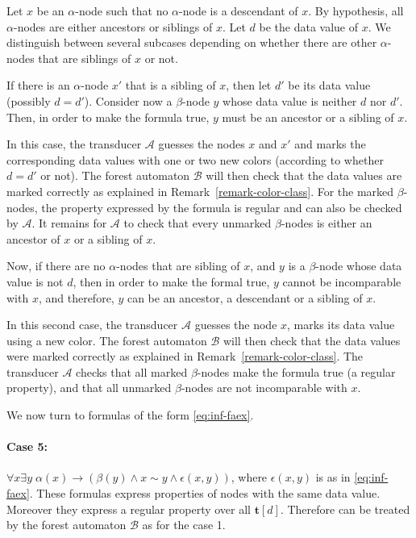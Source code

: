 \documentclass{CSML}
\newcommand\dataeq{\ensuremath{\sim}}
\newcommand\Aa{\mathcal{A}}
\newcommand\Ba{\mathcal{B}}
\newcommand\tree{\boldsymbol{t}}
\begin{document}
Let $x$ be an $\alpha$-node such that no $\alpha$-node is a descendant of $x$. 
By hypothesis, all $\alpha$-nodes are either ancestors or siblings of $x$. 
Let $d$ be the data value of $x$.
We distinguish between several subcases depending on whether 
there are other $\alpha$-nodes that are siblings of $x$ or not.

If there is an $\alpha$-node $x'$ that is a sibling of $x$, then let $d'$
be its data value (possibly $d=d'$).  Consider
now a $\beta$-node $y$ whose data value is neither $d$ nor $d'$.  
Then, in order to make the formula true, $y$ must be an ancestor or a sibling of $x$.

In this case, the transducer $\Aa$ guesses the nodes $x$ and $x'$ and marks the
corresponding data values with one or two new colors (according to whether $d = d'$
or not).  The forest automaton $\Ba$ will then check that the data values are marked
correctly as explained in Remark~\ref{remark-color-class}.
For the marked $\beta$-nodes, the property expressed by the formula
is regular and can also be checked by $\Aa$.
It remains for $\Aa$ to check that every unmarked $\beta$-nodes is 
either an ancestor of $x$ or a sibling of $x$.

Now, if there are no $\alpha$-nodes that are sibling of $x$,
and $y$ is a $\beta$-node whose data value is not $d$, 
then in order to make the formal true, $y$ cannot be incomparable with $x$, 
and therefore, $y$ can be an ancestor, a descendant or a sibling of $x$.

In this second case, the transducer $\Aa$ guesses the node $x$, 
marks its data value using a new color. 
The forest automaton $\Ba$ will then check that the data values were marked
correctly as explained in Remark~\ref{remark-color-class}.
The transducer $\Aa$ checks that all marked $\beta$-nodes make the formula true
(a regular property),
and that all unmarked $\beta$-nodes are not incomparable with $x$.

\medskip

We now turn to formulas of the form \eqref{eq:inf-faex}.

\paragraph{\bf Case 5:} $\forall x \exists y\; \alpha(x) \to (\beta(y) \wedge x \dataeq y
\wedge \epsilon(x, y))$, where $\epsilon(x, y)$ is as in \eqref{eq:inf-faex}.
These formulas express properties of nodes with the same data value. 
Moreover they express a regular property over all $\tree[d]$. 
Therefore can be treated by the forest automaton $\Ba$ as for the case 1.
\end{document}
